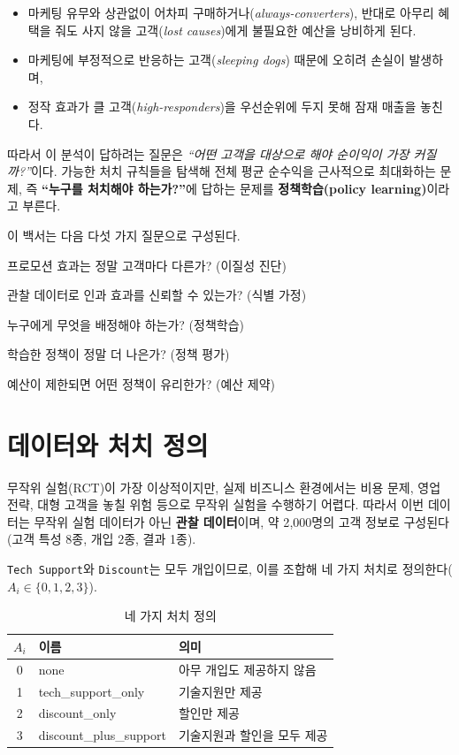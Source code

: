 \documentclass[11pt]{article}
\begin{document}
\begin{itemize}[leftmargin=1.4em, itemsep=2pt]
  \item 마케팅 유무와 상관없이 어차피 구매하거나(\emph{always-converters}), 반대로 아무리 혜택을 줘도 사지 않을 고객(\emph{lost causes})에게 불필요한 예산을 낭비하게 된다.
  \item 마케팅에 부정적으로 반응하는 고객(\emph{sleeping dogs}) 때문에 오히려 손실이 발생하며,
  \item 정작 효과가 클 고객(\emph{high-responders})을 우선순위에 두지 못해 잠재 매출을 놓친다.
\end{itemize}

따라서 이 분석이 답하려는 질문은 \emph{``어떤 고객을 대상으로 해야 순이익이 가장 커질까?''}이다. 가능한 처치 규칙들을 탐색해 전체 평균 순수익을 근사적으로 최대화하는 문제, 즉 \textbf{``누구를 처치해야 하는가?''}에 답하는 문제를 \textbf{정책학습(policy learning)}이라고 부른다.

이 백서는 다음 다섯 가지 질문으로 구성된다.

\begin{description}[leftmargin=2.4em, itemsep=2pt]
  \item[Q1.] 프로모션 효과는 정말 고객마다 다른가? (이질성 진단)
  \item[Q2.] 관찰 데이터로 인과 효과를 신뢰할 수 있는가? (식별 가정)
  \item[Q3.] 누구에게 무엇을 배정해야 하는가? (정책학습)
  \item[Q4.] 학습한 정책이 정말 더 나은가? (정책 평가)
  \item[Q5.] 예산이 제한되면 어떤 정책이 유리한가? (예산 제약)
\end{description}

\section{데이터와 처치 정의}

무작위 실험(RCT)이 가장 이상적이지만, 실제 비즈니스 환경에서는 비용 문제, 영업 전략, 대형 고객을 놓칠 위험 등으로 무작위 실험을 수행하기 어렵다. 따라서 이번 데이터는 무작위 실험 데이터가 아닌 \textbf{관찰 데이터}이며, 약 2{,}000명의 고객 정보로 구성된다(고객 특성 8종, 개입 2종, 결과 1종).

\texttt{Tech Support}와 \texttt{Discount}는 모두 개입이므로, 이를 조합해 네 가지 처치로 정의한다($A_i \in \{0,1,2,3\}$).

\begin{table}[h]
\centering
\small
\caption{네 가지 처치 정의}
\begin{tabular}{cll}
\toprule
$A_i$ & 이름 & 의미 \\
\midrule
0 & none & 아무 개입도 제공하지 않음 \\
1 & tech\_support\_only & 기술지원만 제공 \\
2 & discount\_only & 할인만 제공 \\
3 & discount\_plus\_support & 기술지원과 할인을 모두 제공 \\
\bottomrule
\end{tabular}
\end{table}
\end{document}
